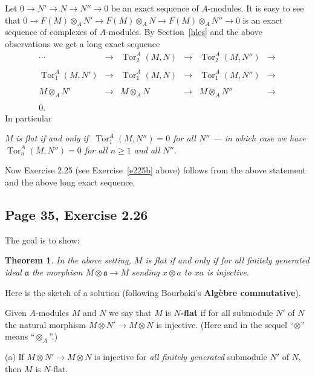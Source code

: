 \documentclass[parskip=half,fontsize=12pt]{scrartcl}%
\newcommand{\mf}{\mathfrak}
\newcommand{\aaa}{\mf a}
\newcommand{\Tor}{\operatorname{Tor}}
\newtheorem{thm}{Theorem}%
\begin{document}
Let $0\to N'\to N\to N''\to0$ be an exact sequence of $A$-modules. It is easy to see that $0\to F(M)\otimes_AN'\to F(M)\otimes_AN\to F(M)\otimes_AN''\to0$ is an exact sequence of complexes of $A$-modules. By Section~\ref{hles} and the above observations we get a long exact sequence 
$$
\begin{matrix}
\cdots&\to&\Tor^A_2(M,N)&\to&\Tor^A_2(M,N'')&\to\\ \\ 
\Tor^A_1(M,N')&\to&\Tor^A_1(M,N)&\to&\Tor^A_1(M,N'')&\to\\ \\ 
M\otimes_AN'&\to&M\otimes_AN&\to&M\otimes_AN''&\to\\ \\ 
0.
\end{matrix}
$$ 
In particular 

$M$ \emph{is flat if and only if $\ \Tor^A_1(M,N'')=0$ for all $N''$ --- in which case we have $\Tor^A_n(M,N'')=0$ for all $n\ge1$ and all $N''$.}

Now Exercise 2.25 (see Exercise~\ref{e225b} above) follows from the above statement and the above long exact sequence.

\subsection{Page 35, Exercise 2.26}\label{35}%

The goal is to show: 



\begin{thm}\label{flatcrit}
In the above setting, $M$ is flat if and only if for all finitely generated ideal $\aaa$ the morphism $M\otimes\aaa\to M$ sending $x\otimes a$ to $xa$ is injective.
\end{thm}

Here is the sketch of a solution (following Bourbaki's \textbf{Algèbre commutative}).

Given $A$-modules $M$ and $N$ we say that $M$ is $N$\textbf{-flat} if for all submodule $N'$ of $N$ the natural morphism $M\otimes N'\to M\otimes N$ is injective. (Here and in the sequel ``$\otimes$'' means ``$\otimes_A$''.) 

(a) If $M\otimes N'\to M\otimes N$ is injective for \emph{all finitely generated} submodule $N'$ of $N$, then $M$ is $N$-flat.
\end{document}
